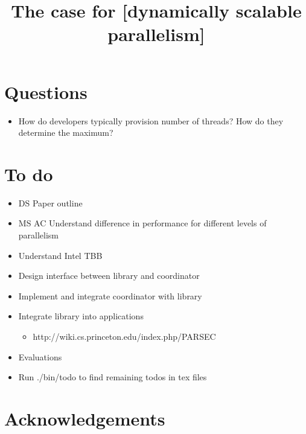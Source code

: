 \documentclass[10pt,preprint]{sigplanconf}
\date{}
\begin{document}
\title{The case for [dynamically scalable parallelism]}
\maketitle



\section{Questions}
\begin{itemize}
  \item How do developers typically provision number of threads? How do they determine the maximum?
\end{itemize}

\section{To do}
\begin{itemize}
  \item DS Paper outline
  \item MS AC Understand difference in performance for different levels of parallelism
  \item [\checkmark] Understand Intel TBB
  \item Design interface between library and coordinator
  \item Implement and integrate coordinator with library
  \item Integrate library into applications
  \begin{itemize}
    \item http://wiki.cs.princeton.edu/index.php/PARSEC
  \end{itemize}
  \item Evaluations
  \item Run ./bin/todo to find remaining todos in tex files
\end{itemize}


% 




% 




\section*{Acknowledgements}

{}

\end{document}
